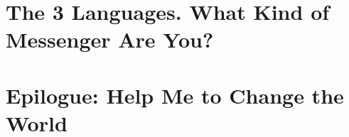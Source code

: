 \documentclass{article}
\numberwithin{equation}{section}
\begin{document}
\section{The 3 Languages. What Kind of Messenger Are You?}


\section{Epilogue: Help Me to Change the World}


\printbibliography[heading=bibintoc]
	
\end{document}
